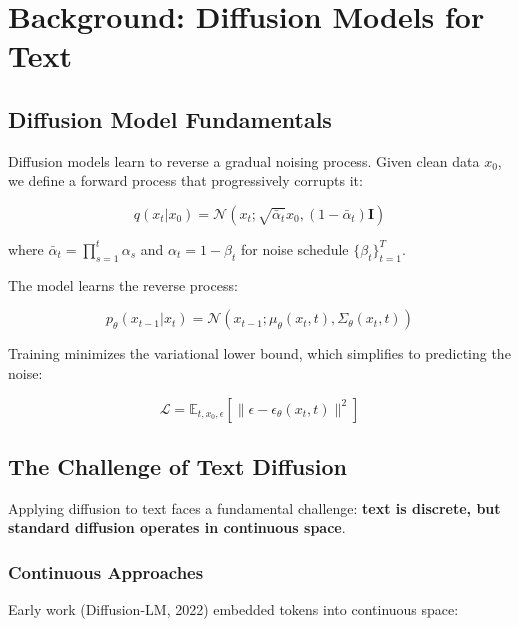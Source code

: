 \documentclass[11pt,a4paper]{article}
\begin{document}
\section{Background: Diffusion Models for Text}

\subsection{Diffusion Model Fundamentals}

Diffusion models learn to reverse a gradual noising process. Given clean data $x_0$, we define a forward process that progressively corrupts it:

\begin{equation}
    q(x_t | x_0) = \mathcal{N}(x_t; \sqrt{\bar{\alpha}_t} x_0, (1-\bar{\alpha}_t)\mathbf{I})
\end{equation}

where $\bar{\alpha}_t = \prod_{s=1}^{t} \alpha_s$ and $\alpha_t = 1 - \beta_t$ for noise schedule $\{\beta_t\}_{t=1}^T$.

The model learns the reverse process:

\begin{equation}
    p_\theta(x_{t-1} | x_t) = \mathcal{N}(x_{t-1}; \mu_\theta(x_t, t), \Sigma_\theta(x_t, t))
\end{equation}

Training minimizes the variational lower bound, which simplifies to predicting the noise:

\begin{equation}
    \mathcal{L} = \mathbb{E}_{t, x_0, \epsilon}\left[ \| \epsilon - \epsilon_\theta(x_t, t) \|^2 \right]
\end{equation}

\subsection{The Challenge of Text Diffusion}

Applying diffusion to text faces a fundamental challenge: \textbf{text is discrete, but standard diffusion operates in continuous space}.

\subsubsection{Continuous Approaches}

Early work (Diffusion-LM, 2022) embedded tokens into continuous space:
\end{document}
